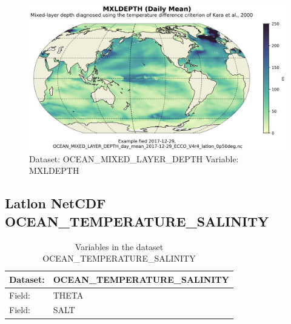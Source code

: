 \begin{figure}[H]
\centering
\includegraphics[scale=0.55]{../images/plots/latlon_plots/Ocean_Mixed_Layer_Depth/MXLDEPTH.png}
\caption{Dataset: OCEAN\_MIXED\_LAYER\_DEPTH Variable: MXLDEPTH}
\label{tab:table-OCEAN_MIXED_LAYER_DEPTH_MXLDEPTH-Plot}
\end{figure}
\pagebreak
\subsection{Latlon NetCDF OCEAN\_TEMPERATURE\_SALINITY}
\newp
\begin{longtable}{|p{}|p{}|}
\caption{Variables in the dataset OCEAN\_TEMPERATURE\_SALINITY}
\label{tab:table-OCEAN_TEMPERATURE_SALINITY-fields} \\ 
\hline \endhead \hline \endfoot
\rowcolor{lightgray} \textbf{Dataset:} & \textbf{OCEAN\_TEMPERATURE\_SALINITY} \\ \hline
Field: &THETA \\ \hline
Field: &SALT \\ \hline
\end{longtable}

\pagebreak
